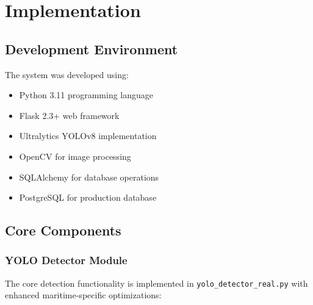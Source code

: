 \documentclass[a4paper,11pt]{article}
\begin{document}
\section{Implementation}

\subsection{Development Environment}
The system was developed using:
\begin{itemize}
    \item Python 3.11 programming language
    \item Flask 2.3+ web framework
    \item Ultralytics YOLOv8 implementation
    \item OpenCV for image processing
    \item SQLAlchemy for database operations
    \item PostgreSQL for production database
\end{itemize}

\subsection{Core Components}

\subsubsection{YOLO Detector Module}
The core detection functionality is implemented in \texttt{yolo\_detector\_real.py} with enhanced maritime-specific optimizations:
\end{document}
